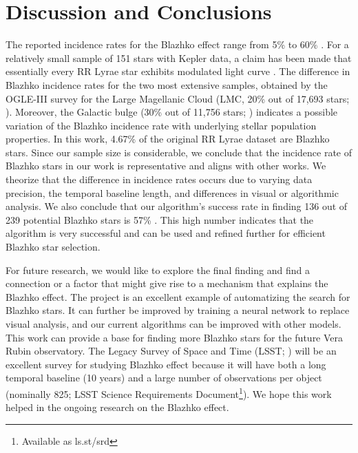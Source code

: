 \documentclass{aa}
\begin{document}
\section{Discussion and Conclusions\label{sec:discussion}}

The reported incidence rates for the Blazhko effect
range from 5\% \citep{2007MNRAS.377.1263S} to 60\% \citep{2014A&A...570A.100S}. For a relatively small sample of
151 stars with Kepler data, a claim has been made that essentially every RR Lyrae star exhibits modulated light curve
\citep{2018A&A...614L...4K}. The difference in Blazhko incidence rates for the two most extensive samples, obtained
by the OGLE-III survey for the Large Magellanic Cloud (LMC, 20\% out of 17,693 stars; \citealt{2009AcA....59....1S}).
Moreover, the Galactic bulge (30\% out of 11,756 stars; \citealt{2011AcA....61....1S}) indicates a possible variation of
the Blazhko incidence rate with underlying stellar population properties. In this work, 4.67\% of the original RR Lyrae dataset are Blazhko stars. Since our sample size is considerable, we conclude that the incidence rate of Blazhko stars in our work is representative and aligns with other works. We theorize that the difference in incidence rates occurs due to varying data precision, the temporal baseline length, and differences in visual or algorithmic analysis.
We also conclude that our algorithm's success rate in finding 136 out of 239 potential Blazhko stars is 57\% . This high number indicates that the algorithm is very successful and can be used and refined further for efficient Blazhko star selection. 

For future research, we would like to explore the final finding and find a connection or a factor that might give rise to a mechanism that explains the Blazhko effect. The project is an excellent example of automatizing the search for Blazhko stars. It can further be improved by training a neural network to replace visual analysis, and our current algorithms can be improved with other models. This work can provide a base for finding more Blazhko stars for the future Vera Rubin observatory. The Legacy Survey of Space and Time (LSST; \citealt{2019ApJ...873..111I}) will be an excellent survey for studying Blazhko effect
\citep{2022ApJS..258....4H} because it will have both a long temporal
baseline (10 years) and a large number of observations per object
(nominally 825; LSST Science Requirements Document\footnote{Available as ls.st/srd}). We hope this work helped in the ongoing research on the Blazhko effect. 
\end{document}
